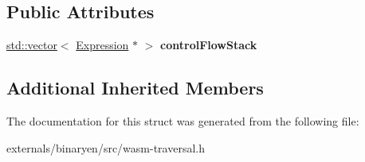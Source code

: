 \subsection*{Public Attributes}
\begin{DoxyCompactItemize}
\item 
\mbox{\label{structwasm_1_1_control_flow_walker_abb4ab53b5a6073b627e1bd115c26433f}} 
\mbox{\hyperlink{classstd_1_1vector}{std\+::vector}}$<$ \mbox{\hyperlink{classwasm_1_1_expression}{Expression}} $\ast$ $>$ {\bfseries control\+Flow\+Stack}
\end{DoxyCompactItemize}
\subsection*{Additional Inherited Members}


The documentation for this struct was generated from the following file\+:\begin{DoxyCompactItemize}
\item 
externals/binaryen/src/wasm-\/traversal.\+h\end{DoxyCompactItemize}
